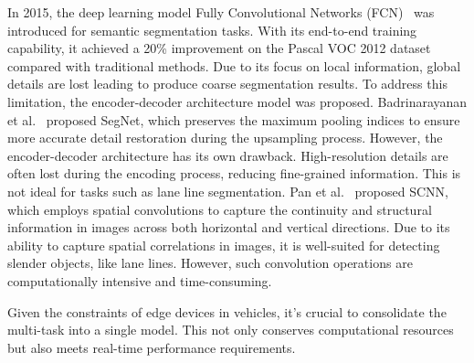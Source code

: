 \documentclass[lettersize,journal]{IEEEtran}
\begin{document}
In 2015, the deep learning model Fully Convolutional Networks (FCN)~\cite{long2015fully} was introduced for semantic segmentation tasks. With its end-to-end training capability, it achieved a 20\% improvement on the Pascal VOC 2012 dataset compared with traditional methods. Due to its focus on local information, global details are lost leading to produce coarse segmentation results. To address this limitation, the encoder-decoder architecture model was proposed. Badrinarayanan et al.~\cite{badrinarayanan2017segnet} proposed SegNet, which preserves the maximum pooling indices to ensure more accurate detail restoration during the upsampling process. However, the encoder-decoder architecture has its own drawback. High-resolution details are often lost during the encoding process, reducing fine-grained information. This is not ideal for tasks such as lane line segmentation. Pan et al.~\cite{pan2018spatial} proposed SCNN, which employs spatial convolutions to capture the continuity and structural information in images across both horizontal and vertical directions. Due to its ability to capture spatial correlations in images, it is well-suited for detecting slender objects, like lane lines. However, such convolution operations are computationally intensive and time-consuming. 

Given the constraints of edge devices in vehicles, it's crucial to consolidate the multi-task into a single model. This not only conserves computational resources but also meets real-time performance requirements.
\end{document}
